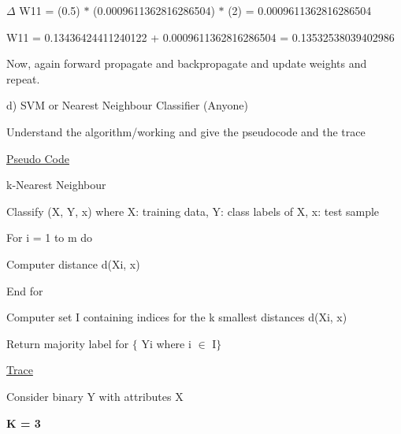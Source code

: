 \documentclass[12pt]{article}
\renewcommand{\_}{\kern-1.5pt\textunderscore\kern-1.5pt}
\begin{document}
$ \Delta $  W11 = (0.5) $\ast$  (0.0009611362816286504) $\ast$  (2) = 0.0009611362816286504 \par

W11 = 0.13436424411240122 + 0.0009611362816286504 = 0.13532538039402986\par

Now, again forward propagate and backpropagate and update weights and repeat.\par


\vspace{\baselineskip}
\begin{Center}
{\fontsize{18pt}{21.6pt}\selectfont d) SVM or Nearest Neighbour Classifier (Anyone)\par}
\end{Center}\par


\vspace{\baselineskip}
{\fontsize{14pt}{16.8pt}\selectfont Understand the algorithm/working and give the pseudocode and the trace\par}\par

{\fontsize{14pt}{16.8pt}\selectfont \uline{Pseudo Code}\par}\par

k-Nearest Neighbour\par

Classify (X, Y, x) where X: training data, Y: class labels of X, x: test sample\par

For i = 1 to m do\par

\tab Computer distance d(Xi, x)\par

End for\par

Computer set I containing indices for the k smallest distances d(Xi, x)\par

Return majority label for $ \{ $ Yi where i \textcolor[HTML]{222222}{$ \in $  I}$ \} $ \par

{\fontsize{14pt}{16.8pt}\selectfont \uline{Trace}\par}\par

Consider binary Y with attributes X\par

\textbf{K = 3}\par
\end{document}
